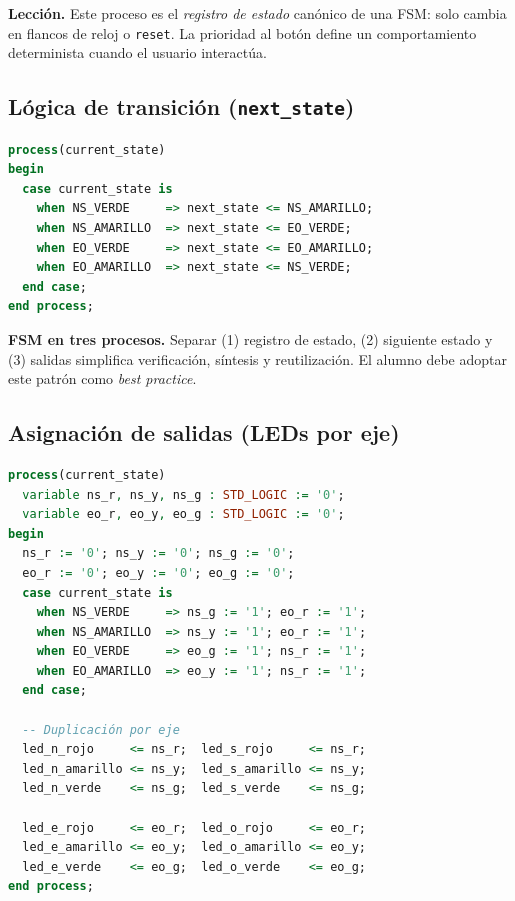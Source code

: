 \documentclass[a4paper,12pt]{article}
\begin{document}
\textbf{Lección.} Este proceso es el \emph{registro de estado} canónico de una FSM: solo cambia en flancos de reloj o \texttt{reset}. La prioridad al botón define un comportamiento determinista cuando el usuario interactúa.

\newpage


\subsection{Lógica de transición (\texttt{next\_state})}

\begin{lstlisting}[language=VHDL, caption={Combinacional: cálculo de \texttt{next\_state}}, label={lst:next-state}]
process(current_state)
begin
  case current_state is
    when NS_VERDE     => next_state <= NS_AMARILLO;
    when NS_AMARILLO  => next_state <= EO_VERDE;
    when EO_VERDE     => next_state <= EO_AMARILLO;
    when EO_AMARILLO  => next_state <= NS_VERDE;
  end case;
end process;
\end{lstlisting}

\textbf{FSM en tres procesos.} Separar (1) registro de estado, (2) siguiente estado y (3) salidas simplifica verificación, síntesis y reutilización. El alumno debe adoptar este patrón como \emph{best practice}.


\subsection{Asignación de salidas (LEDs por eje)}

\begin{lstlisting}[language=VHDL, caption={Combinacional: salidas tipo Moore para LEDs}, label={lst:salidas-leds}]
process(current_state)
  variable ns_r, ns_y, ns_g : STD_LOGIC := '0';
  variable eo_r, eo_y, eo_g : STD_LOGIC := '0';
begin
  ns_r := '0'; ns_y := '0'; ns_g := '0';
  eo_r := '0'; eo_y := '0'; eo_g := '0';
  case current_state is
    when NS_VERDE     => ns_g := '1'; eo_r := '1';
    when NS_AMARILLO  => ns_y := '1'; eo_r := '1';
    when EO_VERDE     => eo_g := '1'; ns_r := '1';
    when EO_AMARILLO  => eo_y := '1'; ns_r := '1';
  end case;

  -- Duplicación por eje
  led_n_rojo     <= ns_r;  led_s_rojo     <= ns_r;
  led_n_amarillo <= ns_y;  led_s_amarillo <= ns_y;
  led_n_verde    <= ns_g;  led_s_verde    <= ns_g;

  led_e_rojo     <= eo_r;  led_o_rojo     <= eo_r;
  led_e_amarillo <= eo_y;  led_o_amarillo <= eo_y;
  led_e_verde    <= eo_g;  led_o_verde    <= eo_g;
end process;
\end{lstlisting}
\end{document}
